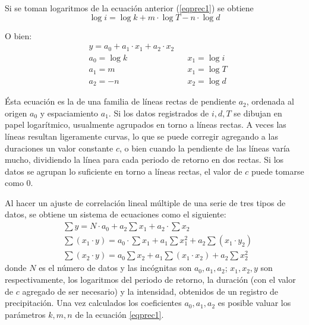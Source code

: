 Si se toman logaritmos de la ecuación anterior (\eqref{eqprec1}) se obtiene
\begin{equation}
    \log{i} =\log{k} + m \cdot \log{T} - n \cdot \log{d}
\end{equation}
\begin{notation}
    O bien:
\begin{align*}
    &y = a_0 + a_1 \cdot x_1 + a_2 \cdot x_2&&\\
    &a_0 = \log{k}&&x_1 = \log{i}\\
    &a_1 = m&&x_1 = \log{T}\\
    &a_2 =- n&&x_2 = \log{d}  
\end{align*}
\end{notation}
Ésta ecuación es la de una familia de líneas rectas de pendiente $a_2$, ordenada al origen $a_0$ y espaciamiento $a_1$. Si los datos registrados de $i,d,T$ se dibujan en papel logarítmico, usualmente agrupados en torno a líneas rectas. A veces las líneas resultan ligeramente curvas, lo que se puede corregir agregando a las duraciones un valor constante $c$, o bien cuando la pendiente de las líneas varía mucho, dividiendo la línea para cada periodo de retorno en dos rectas. Si los datos se agrupan lo suficiente en torno a líneas rectas, el valor de $c$ puede tomarse como 0.

Al hacer un ajuste de correlación lineal múltiple de una serie de tres tipos de datos, se obtiene un sistema de ecuaciones como el siguiente:
\begin{align*}
    &\sum y = N \cdot a_0 + a_2\sum x_1 +a_2 \cdot \sum x_2\\
    &\sum\left(x_1 \cdot y\right) = a_0 \cdot \sum x_1 + a_1\sum x_1^2 +a_2\sum\left(x_1 \cdot y_2\right)\\
    &\sum\left(x_2 \cdot y\right) = a_0\sum x_2 + a_1\sum\left(x_1 \cdot x_2\right) + a_2\sum x_2^2
\end{align*}
donde $N$ es el número de datos y las incógnitas son $a_0,a_1,a_2$; $x_1,x_2,y$ son respectivamente, los logaritmos del periodo de retorno, la duración (con el valor de $c$ agregado de ser necesario) y la intensidad, obtenidos de un registro de precipitación. Una vez calculados los coeficientes $a_0,a_1,a_2$ es posible valuar los parámetros $k,m,n$ de la ecuación \eqref{eqprec1}.

